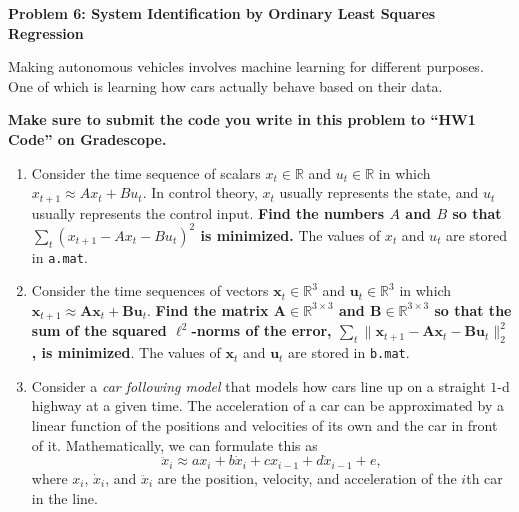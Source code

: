 \documentclass{article}\usepackage[utf8]{inputenc}\usepackage[margin=0.4cm,top=0.4cm,bottom=0.4cm]{geometry}\usepackage[usenames,dvipsnames,svgnames,table]{xcolor}
\begin{document}
\vspace{-2mm}\noindent\begin{mybox}{\begin{center}\textbf{\color{black}Problem 6: System Identification by Ordinary Least Squares Regression}\end{center}}\end{mybox}\vspace{-2mm}
\vspace{10pt}
\noindent Making autonomous vehicles involves machine learning for different purposes. One of which is learning how cars actually behave based on their data.
\vspace{3pt}

\noindent \textbf{Make sure to submit the code you write in this problem to ``HW1 Code'' on Gradescope.}
\begin{enumerate}
\item Consider the time sequence of scalars $x_t \in \mathbb{R}$ and $u_t \in \mathbb{R}$ in which $x_{t+1} \approx A  x_{t} + B u_{t}$.  In control theory, $x_t$ usually represents the state, and $u_t$ usually represents the control input.  \textbf{Find the numbers $A$ and $B$ so that $\sum_t(x_{t+1} - A  x_{t} - B u_{t})^2$ is minimized.} The values of $x_t$ and $u_t$ are stored in \texttt{a.mat}.
\BeginSolution

\EndSolution
\item Consider the time sequences of vectors $\mathbf{x}_t \in \mathbb{R}^3$ and $\mathbf{u}_t \in \mathbb{R}^3$ in which $\mathbf{x}_{t+1} \approx \mathbf{A} \mathbf{x}_{t} + \mathbf{B} \mathbf{u}_{t}$. \textbf{Find the matrix $\mathbf{A} \in \mathbb{R}^{3\times 3}$ and $\mathbf{B} \in \mathbb{R}^{3\times 3}$ so that the sum of the squared $\ell^2$-norms of the error, $\sum_t\|\mathbf{x}_{t+1} - \mathbf{A} \mathbf{x}_{t} - \mathbf{B} \mathbf{u}_{t}\|_2^2$, is minimized}.  The values of $\mathbf{x}_t$ and $\mathbf{u}_t$ are stored in \texttt{b.mat}.
\BeginSolution

\EndSolution
\item Consider a \textit{car following model} that models how cars line up on a straight $1$-d highway at a given time.  The acceleration of a car can be approximated by a linear function of the positions and velocities of its own and the car in front of it.  Mathematically, we can formulate this as $$\ddot{x}_i \approx a x_{i} + b \dot{x}_{i} + c x_{i-1} + d \dot{x}_{i-1} + e,$$ where $x_i$, $\dot x_i$, and $\ddot x_i$ are the position, velocity, and acceleration of the $i$th car in the line.
\vspace{3pt}


\end{enumerate}
\end{document}
